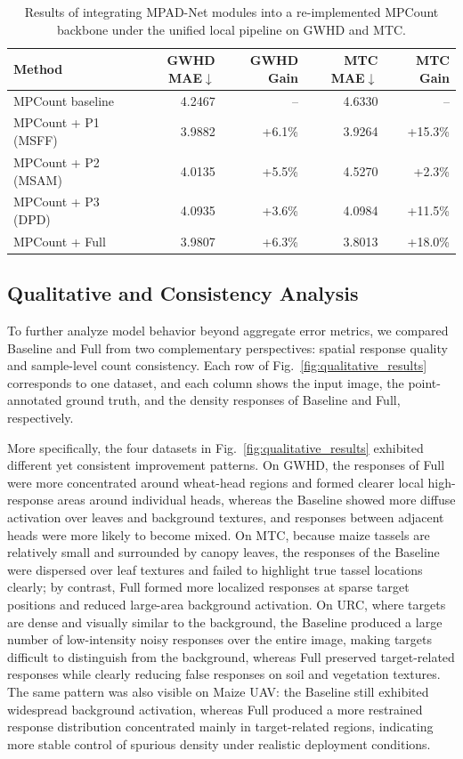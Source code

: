 \documentclass[a4paper,fleqn]{cas-sc}
\begin{document}
	\begin{table}[!htbp]
		\centering
		\caption{Results of integrating MPAD-Net modules into a re-implemented MPCount backbone under the unified local pipeline on GWHD and MTC.}
		\label{tab:mpcount}
		\begin{tabular}{lrrrr}
			\toprule
			Method & GWHD MAE$\downarrow$ & GWHD Gain & MTC MAE$\downarrow$ & MTC Gain \\
			\midrule
			MPCount baseline        & 4.2467 & --     & 4.6330 & -- \\
			MPCount + P1 (MSFF)     & 3.9882 & +6.1\% & 3.9264 & +15.3\% \\
			MPCount + P2 (MSAM)     & 4.0135 & +5.5\% & 4.5270 & +2.3\% \\
			MPCount + P3 (DPD)      & 4.0935 & +3.6\% & 4.0984 & +11.5\% \\
			MPCount + Full          & 3.9807 & +6.3\% & 3.8013 & +18.0\% \\
			\bottomrule
		\end{tabular}
	\end{table}
	
	\subsection{Qualitative and Consistency Analysis}
	
	To further analyze model behavior beyond aggregate error metrics, we compared Baseline and Full from two complementary perspectives: spatial response quality and sample-level count consistency. Each row of Fig.~\ref{fig:qualitative_results} corresponds to one dataset, and each column shows the input image, the point-annotated ground truth, and the density responses of Baseline and Full, respectively.
	
	More specifically, the four datasets in Fig.~\ref{fig:qualitative_results} exhibited different yet consistent improvement patterns. On GWHD, the responses of Full were more concentrated around wheat-head regions and formed clearer local high-response areas around individual heads, whereas the Baseline showed more diffuse activation over leaves and background textures, and responses between adjacent heads were more likely to become mixed. On MTC, because maize tassels are relatively small and surrounded by canopy leaves, the responses of the Baseline were dispersed over leaf textures and failed to highlight true tassel locations clearly; by contrast, Full formed more localized responses at sparse target positions and reduced large-area background activation. On URC, where targets are dense and visually similar to the background, the Baseline produced a large number of low-intensity noisy responses over the entire image, making targets difficult to distinguish from the background, whereas Full preserved target-related responses while clearly reducing false responses on soil and vegetation textures. The same pattern was also visible on Maize UAV: the Baseline still exhibited widespread background activation, whereas Full produced a more restrained response distribution concentrated mainly in target-related regions, indicating more stable control of spurious density under realistic deployment conditions.
	
\end{document}
